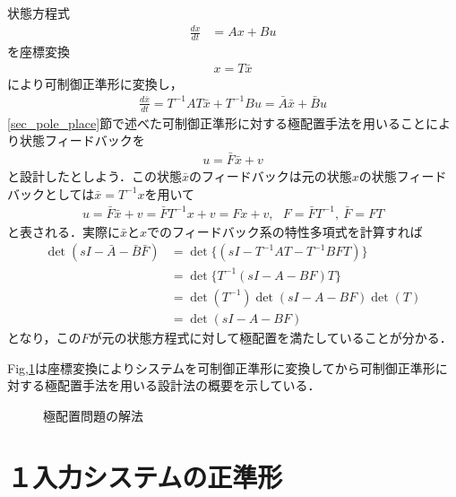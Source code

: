 状態方程式
\begin{align}
 \frac{dx}{dt} &= Ax + Bu
\nonumber
\end{align}
を座標変換
\begin{align}
 x = T\bar{x}
\end{align}
により可制御正準形に変換し，
\begin{align}
 \frac{ d \bar{x}}{dt} = T^{-1} A T \bar{x} + T^{-1} B u = \bar{A} \bar{x} + \bar{B} u
\end{align}
\ref{sec_pole_place}節で述べた可制御正準形に対する極配置手法を用いることにより状態フィードバックを
\begin{align}
 u =\bar{F} \bar{x} + v
\end{align}
と設計したとしよう．この状態$\bar{x}$のフィードバックは元の状態$x$の状態フィードバックとしては$\bar{x} = T^{-1} x$を用いて
\begin{align}
 u = \bar{F} \bar{x} + v = \bar{F} T^{-1} x + v = F x + v, \ \ \ F=\bar{F} T^{-1}, \ \bar{F} = FT
\end{align}
と表される．実際に$\bar{x}$と$x$でのフィードバック系の特性多項式を計算すれば
\begin{align}
  \det (s I - \bar{A} - \bar{B} \bar{F}) 
  &=
  \det \{(s I - T^{-1} A T - T^{-1} B F T) \} 
\nonumber \\
  &=
  \det \{T^{-1}(s I -  A -  B F ) T\} 
\nonumber \\
  &=
  \det (T^{-1}) \det (s I - A - B F) \det (T) 
\nonumber \\
  &=
  \det (s I - A - B F) 
\end{align}
となり，この$F$が元の状態方程式に対して極配置を満たしていることが分かる．

Fig,\ref{fig:poleplace}は座標変換によりシステムを可制御正準形に変換してから可制御正準形に対する極配置手法を用いる設計法の概要を示している．
\begin{figure}
\begin{center}
\scalebox{1}{

}
  \caption{極配置問題の解法}
  \label{fig:poleplace}
\end{center}
\end{figure}

\section{１入力システムの正準形}

